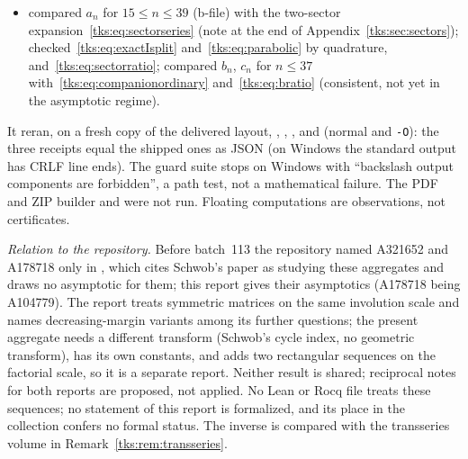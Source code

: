 \begin{writenote}
\begin{itemize}
remainder, times its stated scale, stays bounded) and the Newton
error orders of Proposition~\ref{tks:prop:inverse};
\item compared $a_n$ for $15\le n\le39$ (b-file) with the two-sector
expansion~\eqref{tks:eq:sectorseries} (note at the end of
Appendix~\ref{tks:sec:sectors}); checked~\eqref{tks:eq:exactIsplit}
and~\eqref{tks:eq:parabolic} by quadrature, and~\eqref{tks:eq:sectorratio};
compared $b_n$, $c_n$ for $n\le37$ with~\eqref{tks:eq:companionordinary}
and~\eqref{tks:eq:bratio} (consistent, not yet in the asymptotic regime).
\end{itemize}
It reran, on a fresh copy of the delivered layout, ,
, ,
 and  (normal and
\texttt{-O}): the three receipts equal the shipped ones as JSON (on Windows
the standard output has CRLF line ends). The guard suite stops on Windows
with ``backslash output components are forbidden'', a path test, not a
mathematical failure. The PDF and ZIP builder and 
were not run. Floating computations are observations, not certificates.

\emph{Relation to the repository.} Before batch~113 the repository named
A321652 and A178718 only in , which
cites Schwob's paper as studying these aggregates and draws no asymptotic for
them; this report gives their asymptotics (A178718 being A104779). The
report  treats symmetric matrices on
the same involution scale and names decreasing-margin variants among its
further questions; the present aggregate needs a different transform
(Schwob's cycle index, no geometric transform), has its own constants, and
adds two rectangular sequences on the factorial scale, so it is a separate
report. Neither result is shared; reciprocal notes for both reports are
proposed, not applied. No Lean or Rocq file treats these sequences; no
statement of this report is formalized, and its place in the collection
confers no formal status. The inverse is compared with the transseries
volume in Remark~\ref{tks:rem:transseries}.
\end{writenote}
